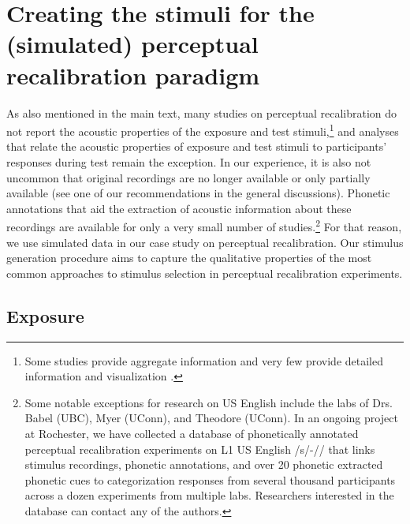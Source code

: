 \documentclass[
  11pt,
  man,floatsintext]{apa6}
\begin{document}
\hypertarget{sec:SI-PR}{%
\section{Creating the stimuli for the (simulated) perceptual recalibration paradigm}\label{sec:SI-PR}}

As also mentioned in the main text, many studies on perceptual recalibration do not report the acoustic properties of the exposure and test stimuli,\footnote{Some studies provide aggregate information \autocites[e.g.,][]{kraljic-samuel2006,kraljic-samuel2007} and very few provide detailed information and visualization \autocite[e.g.,][]{drouin2016}.} and analyses that relate the acoustic properties of exposure and test stimuli to participants' responses during test remain the exception. In our experience, it is also not uncommon that original recordings are no longer available or only partially available (see one of our recommendations in the general discussions). Phonetic annotations that aid the extraction of acoustic information about these recordings are available for only a very small number of studies.\footnote{Some notable exceptions for research on US English include the labs of Drs. Babel (UBC), Myer (UConn), and Theodore (UConn). In an ongoing project at Rochester, we have collected a database of phonetically annotated perceptual recalibration experiments on L1 US English /s/-// that links stimulus recordings, phonetic annotations, and over 20 phonetic extracted phonetic cues to categorization responses from several thousand participants across a dozen experiments from multiple labs. Researchers interested in the database can contact any of the authors.} For that reason, we use simulated data in our case study on perceptual recalibration. Our stimulus generation procedure aims to capture the qualitative properties of the most common approaches to stimulus selection in perceptual recalibration experiments.

\hypertarget{exposure}{%
\subsection{Exposure}\label{exposure}}
\end{document}
